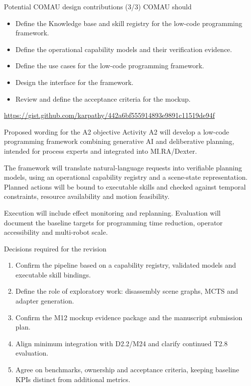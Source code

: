 \documentclass[aspectratio=169,11pt]{beamer}
\begin{document}
\begin{frame}{Potential COMAU design contributions (3/3)}
COMAU should
\begin{itemize}
\item Define the Knowledge base and skill registry for the low-code programming framework.
\item Define the operational capability models and their verification evidence.
\item Define the use cases for the low-code programming framework.
\item Design the interface for the framework.
\item Review and define the acceptance criteria for the mockup.
\end{itemize}
\url{
https://gist.github.com/karpathy/442a6bf555914893e9891c11519de94f
}
\par
\end{frame}


\begin{frame}{Proposed wording for the A2 objective}
Activity A2 will develop a low-code programming framework combining generative AI and deliberative planning, intended for process experts and integrated into MI.RA/Dexter.\par
The framework will translate natural-language requests into verifiable planning models, using an operational capability registry and a scene-state representation. Planned actions will be bound to executable skills and checked against temporal constraints, resource availability and motion feasibility.\par
Execution will include effect monitoring and replanning. Evaluation will document the baseline targets for programming time reduction, operator accessibility and multi-robot scale.
\end{frame}

\begin{frame}{Decisions required for the revision}
\begin{enumerate}\items
\item Confirm the pipeline based on a capability registry, validated models and executable skill bindings.
\item Define the role of exploratory work: disassembly scene graphs, MCTS and adapter generation.
\item Confirm the M12 mockup evidence package and the manuscript submission plan.
\item Align minimum integration with D2.2/M24 and clarify continued T2.8 evaluation.
\item Agree on benchmarks, ownership and acceptance criteria, keeping baseline KPIs distinct from additional metrics.
\end{enumerate}
\end{frame}
\end{document}
